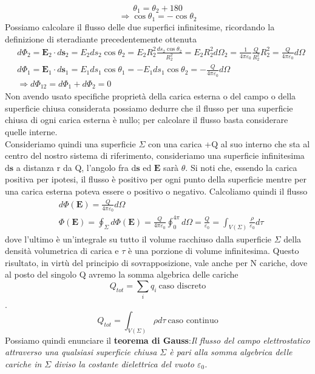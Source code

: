 \documentclass[
10pt, %
a4paper, %
oneside, %
headinclude,footinclude, %
BCOR5mm, %
]{scrartcl}
\begin{document}
\[\theta_1 = \theta_2 + 180\]
\[\Rightarrow \cos\theta_1 = -\cos\theta_2\]
Possiamo calcolare il flusso delle due superfici infinitesime, ricordando la definizione di steradiante precedentemente ottenuta
\begin{align*}
	&d\Phi_2 = \mathbf{E}_2\cdot d\mathbf{s}_2 = E_2 ds_2 \cos\theta_2 = E_2 R_2^2 \frac{ ds_2 \cos\theta_2}{R_2^2} = E_2 R_2^2 d\Omega_2 =\frac{1}{4\pi\varepsilon_0}\frac{Q}{R^2_2}R^2_2= \frac{Q}{4\pi\varepsilon_0}d\Omega \\
	&d\Phi_1 = \mathbf{E}_1\cdot d\mathbf{s}_1 = E_1 ds_1 \cos\theta_1 = -E_1 ds_1 \cos\theta_2 = -\frac{Q}{4\pi\varepsilon_0}d\Omega\\
	&\Rightarrow d\Phi_{12} = d\Phi_1 + d\Phi_2 = 0
\end{align*}
Non avendo usato specifiche proprietà della carica esterna o del campo o della superficie chiusa considerata possiamo dedurre che il flusso per una superficie chiusa di ogni carica esterna è nullo; per calcolare il flusso basta considerare quelle interne.\\
Consideriamo quindi una superficie \(\Sigma\) con una carica +Q al suo interno che sta al centro del nostro sistema di riferimento, consideriamo una superficie infinitesima d$\mathbf{s}$ a distanza r da Q, l'angolo fra d$\mathbf{s}$ ed $\mathbf{E}$ sarà $\theta$. Si noti che, essendo la carica positiva per ipotesi, il flusso è positivo per ogni punto della superficie mentre per una carica esterna poteva essere o positivo o negativo. Calcoliamo quindi il flusso
\begin{align*}
	&d\Phi(\mathbf{E}) = \frac{Q}{4\pi\varepsilon_0}d\Omega\\
	&\Phi(\mathbf{E}) = \oint_{\Sigma} d\Phi(\mathbf{E}) = \frac{Q}{4\pi\varepsilon_0}\oint_0^{4\pi}d\Omega = \frac{Q}{\varepsilon_0} = \int_{V(\Sigma)}\frac{\rho}{\varepsilon_0}d\tau
	\end{align*}
dove l'ultimo è un'integrale su tutto il volume racchiuso dalla superficie $\Sigma$ della densità volumetrica di carica e $\tau$ è una porzione di volume infinitesima. Questo risultato, in virtù del principio di sovrapposizione, vale anche per N cariche, dove al posto del singolo Q avremo la somma algebrica delle cariche 
\[Q_{tot} = \sum_iq_i\ \text{caso discreto}\]. 
\[Q_{tot} = \int_{V(\Sigma)}\rho d\tau\ \text{caso continuo}\]
Possiamo quindi enunciare il \textbf{teorema di Gauss}:\textit{Il flusso del campo elettrostatico attraverso una qualsiasi superficie chiusa $\Sigma$ è pari alla somma algebrica delle cariche in \(\Sigma\) diviso la costante dielettrica del vuoto $\varepsilon_0$.}
\end{document}
